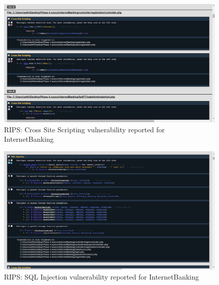 \begin{figure}[ht]
	\centering
	\includegraphics[width=.8\linewidth]{figures/rips_xss.png}
	\caption{RIPS: Cross Site Scripting vulnerability reported for InternetBanking}
	\label{fig:rips_xss}
\end{figure}


\begin{figure}[ht]
	\centering
	\includegraphics[width=.8\linewidth]{figures/rips_sql_injection.png}
	\caption{RIPS: SQL Injection vulnerability reported for InternetBanking}
	\label{fig:rips_sql_injection}
\end{figure}



